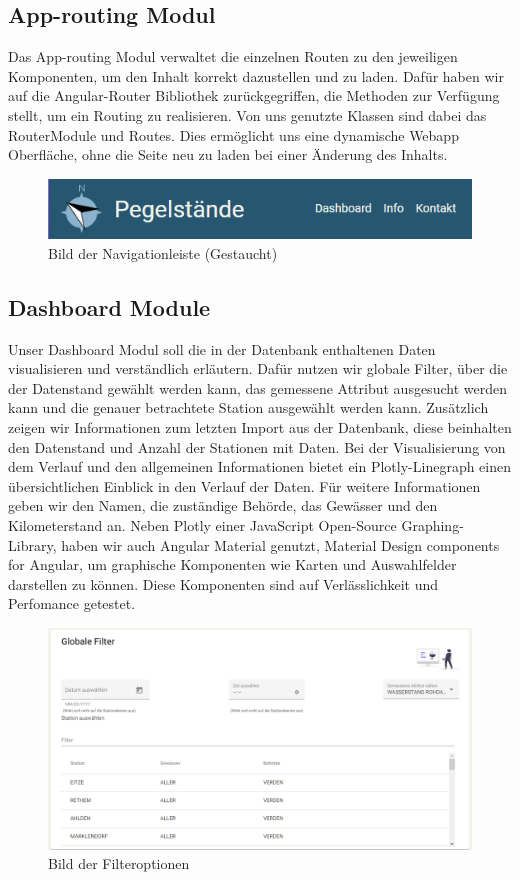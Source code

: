 \newpage
\subsection{App-routing Modul}

Das App-routing Modul verwaltet die einzelnen Routen zu den jeweiligen Komponenten, um den Inhalt korrekt dazustellen und zu laden. Dafür haben wir auf die Angular-Router Bibliothek zurückgegriffen, die Methoden zur Verfügung stellt, um ein Routing zu realisieren. Von uns genutzte Klassen sind dabei das RouterModule und Routes. Dies ermöglicht uns eine dynamische Webapp Oberfläche, ohne die Seite neu zu laden bei einer Änderung des Inhalts.
\begin{figure}[!htb]
 \centering
 \includegraphics{figures/Navigation.PNG}
 \caption{Bild der Navigationleiste (Gestaucht)}
 \label{fig:Bild der Navigationleiste (Gestaucht)}
\end{figure}

\subsection{Dashboard Module}

Unser Dashboard Modul soll die in der Datenbank enthaltenen Daten visualisieren und verständlich erläutern. Dafür nutzen wir globale Filter, über die der Datenstand gewählt werden kann, das gemessene Attribut ausgesucht werden kann und die genauer betrachtete Station ausgewählt werden kann. Zusätzlich zeigen wir Informationen zum letzten Import aus der Datenbank, diese beinhalten den Datenstand und Anzahl der Stationen mit Daten. Bei der Visualisierung von dem Verlauf und den allgemeinen Informationen bietet ein Plotly-Linegraph einen übersichtlichen Einblick in den Verlauf der Daten. Für weitere Informationen geben wir den Namen, die zuständige Behörde, das Gewässer und den Kilometerstand an. Neben Plotly einer JavaScript Open-Source Graphing-Library, haben wir auch Angular Material genutzt, Material Design components for Angular, um graphische Komponenten wie Karten und Auswahlfelder darstellen zu können. Diese Komponenten sind auf Verlässlichkeit und Perfomance getestet.
\begin{figure}[!htb]
 \centering
 \includegraphics[width=12cm]{figures/Liste.PNG}
 \caption{Bild der Filteroptionen}
 \label{fig:Bild der Filteroptionen}
\end{figure}

